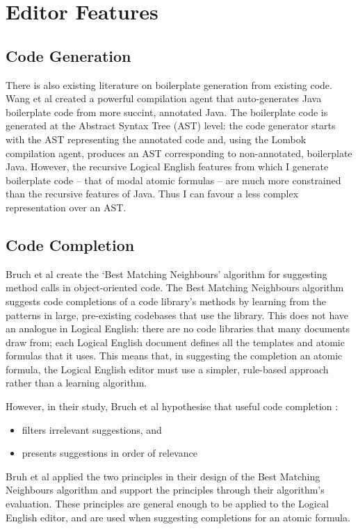 \documentclass[../main.tex]{subfiles}
\begin{document}
\section{Editor Features}
\subsection{Code Generation}
There is also existing literature on boilerplate generation from existing code. Wang et al \cite[]{classless_java} created a powerful compilation agent that auto-generates Java boilerplate code from more succint, annotated Java. The boilerplate code is generated at the Abstract Syntax Tree (AST) level: the code generator starts with the AST representing the annotated code and, using the Lombok compilation agent, produces an AST corresponding to non-annotated, boilerplate Java. However, the recursive Logical English features from which I generate boilerplate code -- that of modal atomic formulas -- are much more constrained than the recursive features of Java. Thus I can favour a less complex representation over an AST.

\subsection{Code Completion}
Bruch et al \cite{code_completion_study} create the `Best Matching Neighbours' algorithm for suggesting method calls in object-oriented code. The Best Matching Neighbours algorithm suggests code completions of a code library's methods by learning from the patterns in large, pre-existing codebases that use the library. This does not have an analogue in Logical English: there are no code libraries that many documents draw from; each Logical English document defines all the templates and atomic formulas that it uses. This means that, in suggesting the completion an atomic formula, the Logical English editor must use a simpler, rule-based approach rather than a learning algorithm.


However, in their study, Bruch et al hypothesise that useful code completion \cite[p.~214]{code_completion_study}:
\begin{itemize}
    \item filters irrelevant suggestions, and
    \item presents suggestions in order of relevance
\end{itemize}
Bruh et al applied the two principles in their design of the Best Matching Neighbours algorithm and support the principles through their algorithm's evaluation. These principles are general enough to be applied to the Logical English editor, and are used when suggesting completions for an atomic formula.
\end{document}
